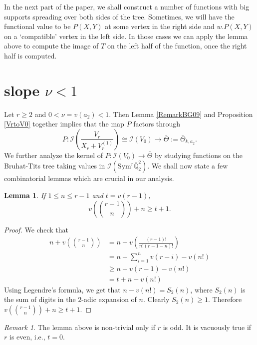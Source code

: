 \documentclass[11pt, reqno]{amsart}
\numberwithin{equation}{section}
\newcommand\Q{\mathbb{Q}}
\newcommand\Sym{{\mathrm {Sym}}}
\newtheorem{lemma}[thm]{Lemma}
\theoremstyle{definition}
\theoremstyle{remark}
\newtheorem{remark}[thm]{Remark}
\theoremstyle{definition}
\theoremstyle{remark}
\theoremstyle{remark}
\begin{document}
 In the next part of the paper, we shall construct a number of functions with big supports spreading over both sides of the tree. Sometimes, we will have the functional value to be $P(X,Y)$ at some vertex in the right side and $w.P(X,Y)$ on a `compatible' vertex in the left side. In those cases we can apply the lemma above to compute the image of $T$ on the left half of the function, once the right half is computed.






\section{slope $\nu <1$}\label{slope<1}

Let $r\geq2$ and $0<\nu=v(a_2)<1$. Then Lemma \ref{RemarkBG09} and Proposition \ref{VrtoV0} together implies that the map $P$ factors through $$P:\mathcal{I}\left(\frac{V_r}{X_{r} + V_r^{(1)}}\right)\cong\mathcal{I}(V_0)\rightarrow \bar\Theta:=\bar\Theta_{k,a_2}.$$ We further analyze the kernel of $P: \mathcal{I}(V_{0}) \rightarrow \bar\Theta$ by studying functions on the  Bruhat-Tits tree taking values in $\mathcal{I}(\Sym^{r}\bar{\Q}_{2}^2)$. 
We shall now state a few combinatorial lemmas which are crucial in our analysis.
\begin{lemma}\label{CMB1}
	  If $1\leq n\leq r-1$ and $t=v(r-1)$,
		\begin{equation}
			v\left({r-1 \choose n}\right)+n \geq t+1.
		\end{equation}
	\end{lemma}
 \begin{proof}
  We check that
  \begin{align*}	
	n+v\left({r-1 \choose n}\right) &= n+ v\left( \frac{(r-1)!}{n!(r-1-n)!}\right)\\
		                  &=\displaystyle
                    n+\sum_{i=1}^{n}v(r-i)-v(n!)\\
	                    &\geq n+ v(r-1)-v(n!)\\
                     &= t+n-v(n!)
\end{align*}
Using Legendre's formula, we get that $n-v(n!) = S_{2}(n)$, where $S_{2}(n)$ is the sum of digits in the $2$-adic expansion of $n$. Clearly $S_{2}(n)\geq 1$. Therefore
$v({r-1 \choose n}) +n \geq t+1.$  
\end{proof}
\begin{remark}
    The lemma above is non-trivial only if $r$ is odd. It is vacuously true if $r$ is even, i.e., $t=0$.
\end{remark}
\end{document}
